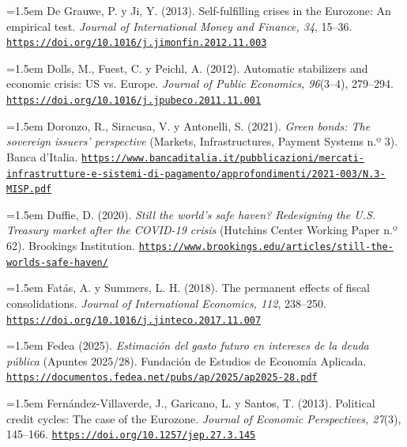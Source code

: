 \documentclass[10pt,a4paper]{article}
\begin{document}
\noindent\hangindent=1.5em De Grauwe, P. y Ji, Y. (2013). Self-fulfilling crises in the Eurozone: An empirical test. \textit{Journal of International Money and Finance, 34}, 15--36. \href{https://doi.org/10.1016/j.jimonfin.2012.11.003}{\nolinkurl{https://doi.org/10.1016/j.jimonfin.2012.11.003}}

\noindent\hangindent=1.5em Dolls, M., Fuest, C. y Peichl, A. (2012). Automatic stabilizers and economic crisis: US vs. Europe. \textit{Journal of Public Economics, 96}(3--4), 279--294. \href{https://doi.org/10.1016/j.jpubeco.2011.11.001}{\nolinkurl{https://doi.org/10.1016/j.jpubeco.2011.11.001}}

\noindent\hangindent=1.5em Doronzo, R., Siracusa, V. y Antonelli, S. (2021). \textit{Green bonds: The sovereign issuers' perspective} (Markets, Infrastructures, Payment Systems n.º 3). Banca d'Italia. \href{https://www.bancaditalia.it/pubblicazioni/mercati-infrastrutture-e-sistemi-di-pagamento/approfondimenti/2021-003/N.3-MISP.pdf}{\nolinkurl{https://www.bancaditalia.it/pubblicazioni/mercati-infrastrutture-e-sistemi-di-pagamento/approfondimenti/2021-003/N.3-MISP.pdf}}

\noindent\hangindent=1.5em Duffie, D. (2020). \textit{Still the world's safe haven? Redesigning the U.S. Treasury market after the COVID-19 crisis} (Hutchins Center Working Paper n.º 62). Brookings Institution. \href{https://www.brookings.edu/articles/still-the-worlds-safe-haven/}{\nolinkurl{https://www.brookings.edu/articles/still-the-worlds-safe-haven/}}

\noindent\hangindent=1.5em Fatás, A. y Summers, L. H. (2018). The permanent effects of fiscal consolidations. \textit{Journal of International Economics, 112}, 238--250. \href{https://doi.org/10.1016/j.jinteco.2017.11.007}{\nolinkurl{https://doi.org/10.1016/j.jinteco.2017.11.007}}

\noindent\hangindent=1.5em Fedea (2025). \textit{Estimación del gasto futuro en intereses de la deuda pública} (Apuntes 2025/28). Fundación de Estudios de Economía Aplicada. \href{https://documentos.fedea.net/pubs/ap/2025/ap2025-28.pdf}{\nolinkurl{https://documentos.fedea.net/pubs/ap/2025/ap2025-28.pdf}}

\noindent\hangindent=1.5em Fernández-Villaverde, J., Garicano, L. y Santos, T. (2013). Political credit cycles: The case of the Eurozone. \textit{Journal of Economic Perspectives, 27}(3), 145--166. \href{https://doi.org/10.1257/jep.27.3.145}{\nolinkurl{https://doi.org/10.1257/jep.27.3.145}}
\end{document}
